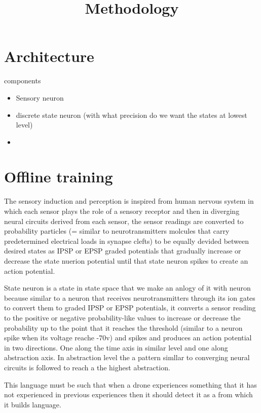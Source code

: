 \documentclass[a4paper]{article}
\title{Methodology}
\date{}
\begin{document}
    \maketitle
    
    
    \section{Architecture}
        components
        \begin{itemize}
            \item Sensory neuron
            \item discrete state neuron (with what precision do we want the states at lowest level)
            \item
        \end{itemize}
    
    
    \section{Offline training}
        The sensory induction and perception is inspired from human nervous system in which each sensor plays the role of a sensory receptor and then in diverging neural circuits derived from each sensor, the sensor readings are converted to probability particles (= similar to neurotransmitters molcules that carry predetermined electrical loads in synapse clefts) to be equally devided between desired states as IPSP or EPSP graded potentials that gradually increase or decrease the state nuerion potential until that state neuron spikes to create an action potential.
        
        State neuron is a state in state space that we make an anlogy of it with neuron because similar to a neuron that receives neurotransmitters through its ion gates to convert them to graded IPSP or EPSP potentials, it converts a sensor reading to the positive or negative probability-like values to increase or decrease the probability up to the point that it reaches the threshold (similar to a neuron spike when its voltage reache -70v) and spikes and produces an action potential in two directions. One along the time axis in similar level and one along abstraction axis.
        In abstraction level the a pattern simllar to converging neural circuits is followed to reach a the highest abstraction.
        
        
        This language must be such that when a drone experiences something that it has not experienced in previous experiences then it should detect it as a from which it builds language.
        
\end{document}
